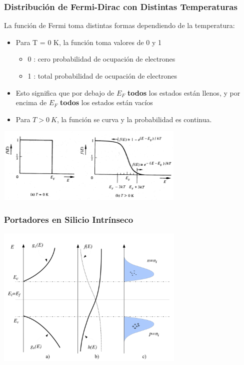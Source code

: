 \documentclass[10pt,t,aspectratio=169]{beamer}
\begin{document}
\begin{frame}[t]
    \frametitle{Distribución de Fermi-Dirac con Distintas Temperaturas}

    La función de Fermi toma distintas formas dependiendo de la temperatura:
    \begin{itemize}
        \item Para T = 0 K, la función toma valores de 0 y 1
        \begin{itemize}
            \item 0 : cero probabilidad de ocupación de electrones
            \item 1 : total probabilidad de ocupación de electrones
        \end{itemize}
        \item Esto significa que por debajo de $E_F$ \textbf{todos} los estados están llenos, y por encima de $E_F$ \textbf{todos} los estados están vacíos
        \item Para $T > 0\ K$, la función se curva y la probabilidad es continua.
    \end{itemize}

    \centering
    \includegraphics[width=9cm]{./figures/fermi-dirac-2.png}
\end{frame}


\begin{frame}[t]
    \frametitle{Portadores en Silicio Intrínseco}

    \centering
    \includegraphics[width=9cm]{./figures/portadores-en-bandas.png}
\end{frame}
\end{document}
